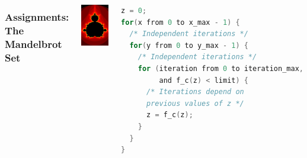 \documentclass[10pt, compress, aspectratio=169]{beamer}
\begin{document}
\begin{frame}[fragile]
    \begin{columns}[T,onlytextwidth]
    \frametitle{Assignments: The Mandelbrot Set}
        \begin{center}
            \includegraphics[width=.76\textwidth]{mandelbrot-rotated}
        \end{center}

        \begin{center}
            \begin{lstlisting}[language=C, basicstyle=\ttfamily\normalsize, numbers=none,
                   frame=no, showspaces=false, showstringspaces=false,
                   numberstyle=\tiny,
                   xleftmargin=0.1cm,
                   keywords={%
                       DATATYPE, pthread_t, pthread_create,
                       pthread_join, task_function, NULL, int, main,
                       void, printf, return, pthread_mutex_t,
                       pthread_attr_t, pthread_attr_init,
                       MAX_THREADS, SIZE, char, struct, malloc,
                       MIN, pthread_mutex_lock, pthread_mutex_unlock,
                       pthread_exit, from, to, and, for%
                       },
                   otherkeywords={::, \#pragma, \#include, <<<,>>>, \&, \*, +, -, /, [, ], >, <}
                   ]
z = 0;
for(x from 0 to x_max - 1) {
  /* Independent iterations */
  for(y from 0 to y_max - 1) {
    /* Independent iterations */
    for (iteration from 0 to iteration_max,
         and f_c(z) < limit) {
      /* Iterations depend on
      previous values of z */
      z = f_c(z);
    }
  }
}
            \end{lstlisting}
        \end{center}
    \end{columns}
\end{frame}
\end{document}
